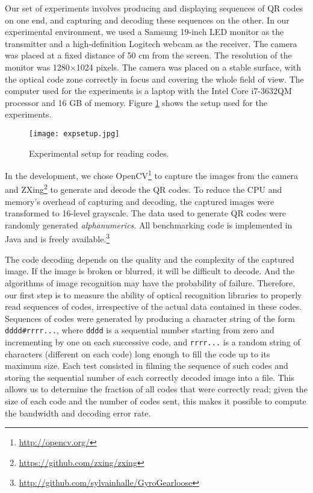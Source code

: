 Our set of experiments involves producing and displaying sequences of QR codes on one end, and capturing and decoding these sequences on the other. In our experimental environment, we used a Samsung 19-inch LED monitor as the transmitter and a high-definition Logitech webcam as the receiver. The camera was placed at a fixed distance of 50 cm from the screen. The resolution of the monitor was 1280$\times$1024 pixels. %
The camera was placed on a stable surface, with the optical code zone correctly in focus and covering the whole field of view. The computer used for the experiments is a laptop with the Intel Core i7-3632QM processor and 16 GB of memory. Figure \ref{fig:qr:setup} shows the setup used for the experiments.

\begin{figure}
\centering
\texttt{[image: expsetup.jpg]}
\caption{Experimental setup for reading codes.}
\label{fig:qr:setup}
\end{figure}

In the development, we chose OpenCV\footnote{\url{http://opencv.org/}} to capture the images from the camera and ZXing\footnote{\url{https://github.com/zxing/zxing}} to generate and decode the QR codes. To reduce the CPU and memory's overhead of capturing and decoding, the captured images were transformed to 16-level grayscale. The data used to generate QR codes were randomly generated \emph{alphanumerics}. All benchmarking code is implemented in Java and is freely available.\footnote{\url{http://github.com/sylvainhalle/GyroGearloose}}

The code decoding depends on the quality and the complexity of the captured image. If the image is broken or blurred, it will be difficult to decode. And the algorithms of image recognition may have the probability of failure\citep{adel2006}. Therefore, our first step is to measure the ability of optical recognition libraries to properly read sequences of codes, irrespective of the actual data contained in these codes. Sequences of codes were generated by producing a character string of the form \verb+dddd#rrrr...+, where \verb+dddd+ is a sequential number starting from zero and incrementing by one on each successive code, and \verb+rrrr...+ is a random string of characters (different on each code) long enough to fill the code up to its maximum size. Each test consisted in filming the sequence of such codes and storing the sequential number of each correctly decoded image into a file. This allows us to determine the fraction of all codes that were correctly read; given the size of each code and the number of codes sent, this makes it possible to compute the bandwidth and decoding error rate.

